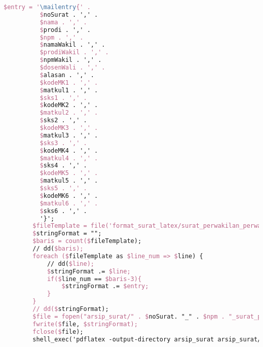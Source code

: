 \begin{lstlisting}[language=tex,basicstyle=\tiny,caption=HistorysuratController.php]
        $entry = '\mailentry{' .
          $noSurat . ',' .
          $nama . ',' .
          $prodi . ',' .
          $npm . ',' .
          $namaWakil . ',' .
          $prodiWakil . ',' .
          $npmWakil . ',' .
          $dosenWali . ',' .
          $alasan . ',' .
          $kodeMK1 . ',' .
          $matkul1 . ',' .
          $sks1 . ',' .
          $kodeMK2 . ',' .
          $matkul2 . ',' .
          $sks2 . ',' .
          $kodeMK3 . ',' .
          $matkul3 . ',' .
          $sks3 . ',' .
          $kodeMK4 . ',' .
          $matkul4 . ',' .
          $sks4 . ',' .
          $kodeMK5 . ',' .
          $matkul5 . ',' .
          $sks5 . ',' .
          $kodeMK6 . ',' .
          $matkul6 . ',' .
          $sks6 . ',' .
          '}';
        $fileTemplate = file('format_surat_latex/surat_perwakilan_perwalian_6mk.tex');
        $stringFormat = "";
        $baris = count($fileTemplate);
        // dd($baris);
        foreach ($fileTemplate as $line_num => $line) {
            // dd($line);
            $stringFormat .= $line;
            if($line_num == $baris-3){
                $stringFormat .= $entry;
            }
        }
        // dd($stringFormat);
        $file = fopen("arsip_surat/" . $noSurat. "_" . $npm . "_surat_perwakilan_perwalian_6mk.tex", "w");
        fwrite($file, $stringFormat);
        fclose($file);
        shell_exec('pdflatex -output-directory arsip_surat arsip_surat/' . $noSurat . '_' . $npm . '_surat_perwakilan_perwalian_6mk.tex');


\end{lstlisting}
